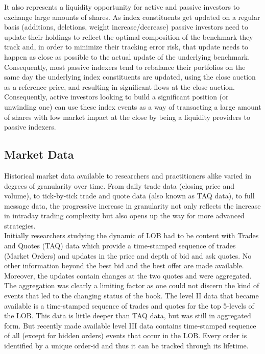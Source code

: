 It also represents a liquidity opportunity for active and passive investors to exchange large amounts of shares. As index constituents get updated on a regular basis (additions, deletions, weight increase/decrease) passive investors need to update their holdings to reflect the optimal composition of the benchmark they track and, in order to minimize their tracking error risk, that update needs to happen as close as possible to the actual update of the underlying benchmark. Consequently, most passive indexers tend to rebalance their portfolios on the same day the underlying index constituents are updated, using the close auction as a reference price, and resulting in significant flows at the close auction. Consequently, active investors looking to build a significant position (or unwinding one) can use these index events as a way of transacting a large amount of shares with low market impact at the close by being a liquidity providers to passive indexers.  



\subsection{Market Data}

Historical market data available to researchers and practitioners alike varied in degrees of granularity over time. From daily trade data (closing price and volume), to tick-by-tick trade and quote data (also known as TAQ data), to full message data, the progressive increase in granularity not only reflects the increase in intraday trading complexity but also opens up the way for more advanced strategies. \\

Initially researchers studying the dynamic of LOB had to be content with Trades and Quotes (TAQ) data which provide a time-stamped sequence of trades (Market Orders) and updates in the price and depth of bid and ask quotes. No other information beyond the best bid and the best offer are made available. Moreover, the updates contain changes at the two quotes and were aggregated. The aggregation was clearly a limiting factor as one could not discern the kind of events that led to the changing status of the book. The level II data that became available is a time-stamped sequence of trades and quotes for the top 5-levels of the LOB. This data is little deeper than TAQ data, but was still in aggregated form. But recently made available level III data contains time-stamped sequence of all (except for hidden orders) events that occur in the LOB. Every order is identified by a unique order-id and thus it can be tracked through its lifetime. \\



